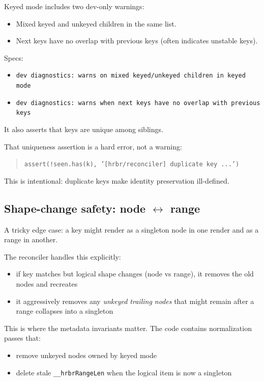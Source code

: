 Keyed mode includes two dev-only warnings:

\begin{itemize}
  \item Mixed keyed and unkeyed children in the same list.
  \item Next keys have no overlap with previous keys (often indicates unstable keys).
\end{itemize}

Specs:

\begin{itemize}
  \item \texttt{dev diagnostics: warns on mixed keyed/unkeyed children in keyed mode}
  \item \texttt{dev diagnostics: warns when next keys have no overlap with previous keys}
\end{itemize}

It also asserts that keys are unique among siblings.

That uniqueness assertion is a hard error, not a warning:

\begin{quote}
	\texttt{assert(!seen.has(k), '[hrbr/reconciler] duplicate key ...')}
\end{quote}

This is intentional: duplicate keys make identity preservation ill-defined.

\subsection{Shape-change safety: node \(\leftrightarrow\) range}

A tricky edge case: a key might render as a singleton node in one render and as a range in another.

The reconciler handles this explicitly:

\begin{itemize}
  \item if key matches but logical shape changes (node vs range), it removes the old nodes and recreates
  \item it aggressively removes any \emph{unkeyed trailing nodes} that might remain after a range collapses into a singleton
\end{itemize}

This is where the metadata invariants matter. The code contains normalization passes that:

\begin{itemize}
  \item remove unkeyed nodes owned by keyed mode
  \item delete stale \texttt{\_\_hrbrRangeLen} when the logical item is now a singleton
\end{itemize}

